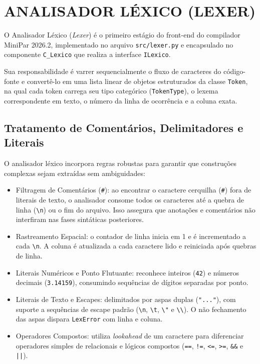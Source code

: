 \chapter{ANALISADOR LÉXICO (LEXER)}

O Analisador Léxico (\textit{Lexer}) é o primeiro estágio do front-end do compilador MiniPar 2026.2, implementado no arquivo \texttt{src/lexer.py} e encapsulado no componente \texttt{C\_Lexico} que realiza a interface \texttt{ILexico}.

Sua responsabilidade é varrer sequencialmente o fluxo de caracteres do código-fonte e convertê-lo em uma lista linear de objetos estruturados da classe \texttt{Token}, na qual cada token carrega seu tipo categórico (\texttt{TokenType}), o lexema correspondente em texto, o número da linha de ocorrência e a coluna exata.

\section{Tratamento de Comentários, Delimitadores e Literais}

O analisador léxico incorpora regras robustas para garantir que construções complexas sejam extraídas sem ambiguidades:
\begin{itemize}
    \item Filtragem de Comentários (\texttt{\#}): ao encontrar o caractere cerquilha (\texttt{\#}) fora de literais de texto, o analisador consome todos os caracteres até a quebra de linha (\texttt{\textbackslash n}) ou o fim do arquivo. Isso assegura que anotações e comentários não interfiram nas fases sintáticas posteriores.
    \item Rastreamento Espacial: o contador de linha inicia em 1 e é incrementado a cada \texttt{\textbackslash n}. A coluna é atualizada a cada caractere lido e reiniciada após quebras de linha.
    \item Literais Numéricos e Ponto Flutuante: reconhece inteiros (\texttt{42}) e números decimais (\texttt{3.14159}), consumindo sequências de dígitos separadas por ponto.
    \item Literais de Texto e Escapes: delimitados por aspas duplas (\texttt{"..."}), com suporte a sequências de escape padrão (\texttt{\textbackslash n}, \texttt{\textbackslash t}, \texttt{\textbackslash "} e \texttt{\textbackslash\textbackslash}). O não fechamento das aspas dispara \texttt{LexError} com linha e coluna.
    \item Operadores Compostos: utiliza \textit{lookahead} de um caractere para diferenciar operadores simples de relacionais e lógicos compostos (\texttt{==}, \texttt{!=}, \texttt{<=}, \texttt{>=}, \texttt{\&\&} e \texttt{||}).
\end{itemize}

